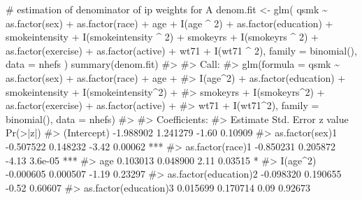 \documentclass[
  10pt,
  a4paper,
]{book}
\newenvironment{Shaded}{\begin{snugshade}}{\end{snugshade}}
\newcommand{\AttributeTok}[1]{\textcolor[rgb]{0.40,0.45,0.13}{#1}}
\newcommand{\CommentTok}[1]{\textcolor[rgb]{0.37,0.37,0.37}{#1}}
\newcommand{\DecValTok}[1]{\textcolor[rgb]{0.68,0.00,0.00}{#1}}
\newcommand{\FunctionTok}[1]{\textcolor[rgb]{0.28,0.35,0.67}{#1}}
\newcommand{\NormalTok}[1]{\textcolor[rgb]{0.00,0.46,0.62}{#1}}
\newcommand{\OtherTok}[1]{\textcolor[rgb]{0.00,0.46,0.62}{#1}}
\newcommand{\SpecialCharTok}[1]{\textcolor[rgb]{0.37,0.37,0.37}{#1}}
\begin{document}
\begin{Shaded}
\begin{Highlighting}[]
\CommentTok{\# estimation of denominator of ip weights for A}
\NormalTok{denom.fit }\OtherTok{\textless{}{-}}
  \FunctionTok{glm}\NormalTok{(}
\NormalTok{    qsmk }\SpecialCharTok{\textasciitilde{}} \FunctionTok{as.factor}\NormalTok{(sex) }\SpecialCharTok{+} \FunctionTok{as.factor}\NormalTok{(race) }\SpecialCharTok{+}\NormalTok{ age }\SpecialCharTok{+} \FunctionTok{I}\NormalTok{(age }\SpecialCharTok{\^{}} \DecValTok{2}\NormalTok{) }\SpecialCharTok{+}
      \FunctionTok{as.factor}\NormalTok{(education) }\SpecialCharTok{+}\NormalTok{ smokeintensity }\SpecialCharTok{+}
      \FunctionTok{I}\NormalTok{(smokeintensity }\SpecialCharTok{\^{}} \DecValTok{2}\NormalTok{) }\SpecialCharTok{+}\NormalTok{ smokeyrs }\SpecialCharTok{+} \FunctionTok{I}\NormalTok{(smokeyrs }\SpecialCharTok{\^{}} \DecValTok{2}\NormalTok{) }\SpecialCharTok{+}
      \FunctionTok{as.factor}\NormalTok{(exercise) }\SpecialCharTok{+} \FunctionTok{as.factor}\NormalTok{(active) }\SpecialCharTok{+}\NormalTok{ wt71 }\SpecialCharTok{+} \FunctionTok{I}\NormalTok{(wt71 }\SpecialCharTok{\^{}} \DecValTok{2}\NormalTok{),}
    \AttributeTok{family =} \FunctionTok{binomial}\NormalTok{(),}
    \AttributeTok{data =}\NormalTok{ nhefs}
\NormalTok{  )}
\FunctionTok{summary}\NormalTok{(denom.fit)}
\CommentTok{\#\textgreater{} }
\CommentTok{\#\textgreater{} Call:}
\CommentTok{\#\textgreater{} glm(formula = qsmk \textasciitilde{} as.factor(sex) + as.factor(race) + age + }
\CommentTok{\#\textgreater{}     I(age\^{}2) + as.factor(education) + smokeintensity + I(smokeintensity\^{}2) + }
\CommentTok{\#\textgreater{}     smokeyrs + I(smokeyrs\^{}2) + as.factor(exercise) + as.factor(active) + }
\CommentTok{\#\textgreater{}     wt71 + I(wt71\^{}2), family = binomial(), data = nhefs)}
\CommentTok{\#\textgreater{} }
\CommentTok{\#\textgreater{} Coefficients:}
\CommentTok{\#\textgreater{}                        Estimate Std. Error z value Pr(\textgreater{}|z|)    }
\CommentTok{\#\textgreater{} (Intercept)           {-}1.988902   1.241279   {-}1.60  0.10909    }
\CommentTok{\#\textgreater{} as.factor(sex)1       {-}0.507522   0.148232   {-}3.42  0.00062 ***}
\CommentTok{\#\textgreater{} as.factor(race)1      {-}0.850231   0.205872   {-}4.13  3.6e{-}05 ***}
\CommentTok{\#\textgreater{} age                    0.103013   0.048900    2.11  0.03515 *  }
\CommentTok{\#\textgreater{} I(age\^{}2)              {-}0.000605   0.000507   {-}1.19  0.23297    }
\CommentTok{\#\textgreater{} as.factor(education)2 {-}0.098320   0.190655   {-}0.52  0.60607    }
\CommentTok{\#\textgreater{} as.factor(education)3  0.015699   0.170714    0.09  0.92673    }

\end{Highlighting}
\end{Shaded}
\end{document}
